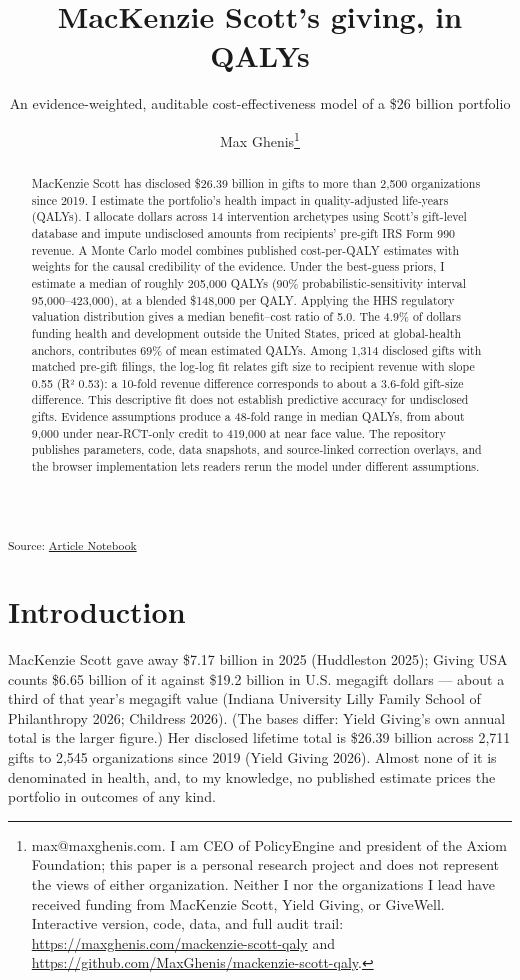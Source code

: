 \documentclass[
  11pt,
  letterpaper,
  DIV=11,
  numbers=noendperiod]{scrartcl}
\title{MacKenzie Scott's giving, in QALYs}
\subtitle{An evidence-weighted, auditable cost-effectiveness model of a
\$26 billion portfolio}
\author{Max
Ghenis\thanks{max@maxghenis.com. I am CEO of PolicyEngine and president of the Axiom Foundation; this paper is a personal research project and does not represent the views of either organization. Neither I nor the organizations I lead have received funding from MacKenzie Scott, Yield Giving, or GiveWell. Interactive version, code, data, and full audit trail: \url{https://maxghenis.com/mackenzie-scott-qaly} and \url{https://github.com/MaxGhenis/mackenzie-scott-qaly}.}}
\date{}
\newcounter{none} %
\begin{document}
\maketitle
\begin{abstract}
MacKenzie Scott has disclosed \$26.39 billion in gifts to more than
2,500 organizations since 2019. I estimate the portfolio's health impact
in quality-adjusted life-years (QALYs). I allocate dollars across 14
intervention archetypes using Scott's gift-level database and impute
undisclosed amounts from recipients' pre-gift IRS Form 990 revenue. A
Monte Carlo model combines published cost-per-QALY estimates with
weights for the causal credibility of the evidence. Under the best-guess
priors, I estimate a median of roughly 205,000 QALYs (90\%
probabilistic-sensitivity interval 95,000--423,000), at a blended
\$148,000 per QALY. Applying the HHS regulatory valuation distribution
gives a median benefit--cost ratio of 5.0. The 4.9\% of dollars funding
health and development outside the United States, priced at
global-health anchors, contributes 69\% of mean estimated QALYs. Among
1,314 disclosed gifts with matched pre-gift filings, the log-log fit
relates gift size to recipient revenue with slope 0.55 (R² 0.53): a
10-fold revenue difference corresponds to about a 3.6-fold gift-size
difference. This descriptive fit does not establish predictive accuracy
for undisclosed gifts. Evidence assumptions produce a 48-fold range in
median QALYs, from about 9,000 under near-RCT-only credit to 419,000 at
near face value. The repository publishes parameters, code, data
snapshots, and source-linked correction overlays, and the browser
implementation lets readers rerun the model under different assumptions.
\end{abstract}


\textsubscript{Source:
\href{https://MaxGhenis.github.io/mackenzie-scott-qaly/index.qmd.html}{Article
Notebook}}

\section{Introduction}\label{introduction}

MacKenzie Scott gave away \$7.17 billion in 2025 (Huddleston 2025);
Giving USA counts \$6.65 billion of it against \$19.2 billion in U.S.
megagift dollars --- about a third of that year's megagift value
(Indiana University Lilly Family School of Philanthropy 2026; Childress
2026). (The bases differ: Yield Giving's own annual total is the larger
figure.) Her disclosed lifetime total is \$26.39 billion across 2,711
gifts to 2,545 organizations since 2019 (Yield Giving 2026). Almost none
of it is denominated in health, and, to my knowledge, no published
estimate prices the portfolio in outcomes of any kind.
\end{document}
